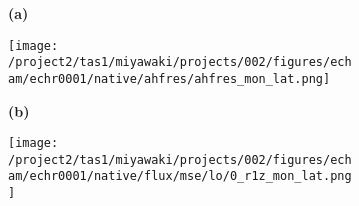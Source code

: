 \documentclass[preview]{standalone}
\begin{document}
\begin{figure}
  \begin{subfigure}[t]{0.05\textwidth}
    \textbf{\large{(a)}}
  \end{subfigure}
  \begin{subfigure}[t]{0.95\textwidth}
    \texttt{[image: /project2/tas1/miyawaki/projects/002/figures/echam/echr0001/native/ahfres/ahfres\_mon\_lat.png]}
  \end{subfigure}

  \begin{subfigure}[t]{0.05\textwidth}
    \textbf{\large{(b)}}
  \end{subfigure}
  \begin{subfigure}[t]{0.95\textwidth}
    \texttt{[image: /project2/tas1/miyawaki/projects/002/figures/echam/echr0001/native/flux/mse/lo/0\_r1z\_mon\_lat.png]}
  \end{subfigure}

\end{figure}
\end{document}

